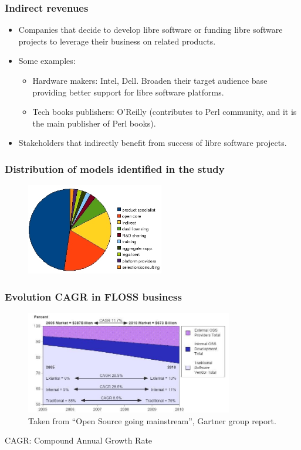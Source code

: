 \begin{frame}
 \frametitle{Indirect revenues}
 \begin{itemize}
  \item Companies that decide to develop libre software or funding libre software projects to leverage
their business on related products.
  \item Some examples:
   \begin{itemize}
    \item Hardware makers: Intel, Dell. Broaden their target audience base providing better support for libre
software platforms.
    \item Tech books publishers: O'Reilly (contributes to Perl community, and it is the main publisher of Perl books).
   \end{itemize}
   \item Stakeholders that indirectly benefit from success of libre software projects.
 \end{itemize}
\end{frame}

\begin{frame}
\frametitle{Distribution of models identified in the study}
\begin{figure}
 \includegraphics[height=4cm]{figs/models-share.jpg}
\end{figure}
\end{frame}

\begin{frame}
\frametitle{Evolution CAGR in FLOSS business}
\begin{center}
\begin{figure}
 \includegraphics[height=4.5cm]{figs/Economic-Gartner.jpg}
 \caption{\small Taken from ``Open Source going mainstream'', Gartner group report.}
\end{figure}
\end{center}
CAGR: Compound Annual Growth Rate
\end{frame}

